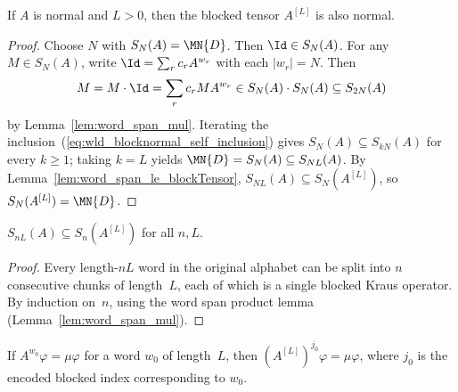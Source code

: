 \begin{theorem}\label{thm:isNormal_blockTensor}
    \leanok
    If $A$ is normal and $L > 0$, then the blocked tensor
    $A^{[L]}$ is also normal.
\end{theorem}

\begin{proof}\leanok
    Choose $N$ with $S_N(A) = \MN{D}$. Then $\Id \in S_N(A)$.
    For any $M \in S_N(A)$, write
    $\Id = \sum_r c_r A^{w_r}$ with each $|w_r| = N$.
    Then
    \begin{equation}\label{eq:wld_blocknormal_self_inclusion}
        M = M \cdot \Id = \sum_r c_r M A^{w_r}
        \in S_N(A) \cdot S_N(A) \subseteq S_{2N}(A)
    \end{equation}
    by Lemma~\ref{lem:word_span_mul}.
    Iterating the inclusion~(\ref{eq:wld_blocknormal_self_inclusion}) gives
    $S_N(A) \subseteq S_{kN}(A)$
    for every $k \ge 1$; taking $k = L$ yields
    $\MN{D} = S_N(A) \subseteq S_{NL}(A)$.
    By Lemma~\ref{lem:word_span_le_blockTensor},
    $S_{NL}(A) \subseteq S_N(A^{[L]})$,
    so $S_N(A^{[L]}) = \MN{D}$.
\end{proof}

\begin{lemma}%
    \label{lem:word_span_le_blockTensor}
    \leanok
    $S_{nL}(A) \subseteq S_n(A^{[L]})$ for all $n, L$.
\end{lemma}

\begin{proof}\leanok
    Every length-$nL$ word in the original alphabet
    can be split into $n$ consecutive chunks of length~$L$,
    each of which is a single blocked Kraus operator.
    By induction on~$n$, using the word span product lemma
    (Lemma~\ref{lem:word_span_mul}).
\end{proof}

\begin{theorem}%
    \label{thm:blockTensor_single_eigenvector}
    \leanok
    If $A^{w_0} \varphi = \mu \varphi$ for a word $w_0$
    of length~$L$, then
    $(A^{[L]})^{j_0} \varphi = \mu \varphi$,
    where $j_0$ is the encoded blocked index corresponding
    to $w_0$.
\end{theorem}

